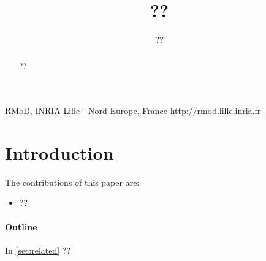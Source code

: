 \documentclass[10pt]{sigplanconf}
\newcommand{\seclabel}[1] {\label{sec:#1}}
\newcommand{\secref}  [1] {\autoref{sec:#1}}
\newcommand{\ST}  {Small\-talk\xspace}
\begin{document}


\titlebanner{}  %

\title{??}
\subtitle{??}

{RMoD, INRIA Lille - Nord Europe, France}
{\url{http://rmod.lille.inria.fr}}

\maketitle
\begin{abstract}
??
\end{abstract}


\section{Introduction}
\seclabel{introduction}


The contributions of this paper are:
\begin{itemize}
\item ??
\end{itemize}


\paragraph{Outline}
In \secref{related} ??
\end{document}
